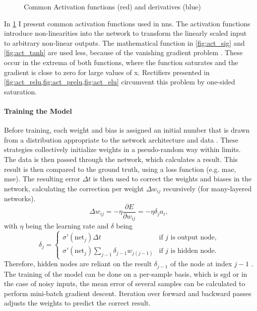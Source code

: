 \begin{figure}
    \caption{Common Activation functions (red) and derivatives (blue)}
    \label{fig:activations}
\end{figure}

In \cref{fig:activations} I present common activation functions used in \acp{nn}. The activation functions introduce non-linearities into the network to transform the linearly scaled input to arbitrary non-linear outputs. The mathematical function in \cref{fig:act_sig} and \cref{fig:act_tanh} are used less, because of the vanishing gradient problem \citep{hochreiter1991untersuchungen}. These occur in the extrema of both functions, where the function saturates and the gradient is close to zero for large values of x. Rectifiers presented in \cref{fig:act_relu,fig:act_prelu,fig:act_elu} circumvent this problem by one-sided saturation. 

\paragraph{Training the Model} 
Before training, each weight and bias is assigned an initial number that is drawn from a distribution appropriate to the network architecture and data \citep{lecun2012efficient, glorot2010understanding, he2015delving}. These strategies collectively initialize weights in a pseudo-random way within limits. The data is then passed through the network, which calculates a result. This result is then compared to the ground truth, using a loss function (e.g. \ac{mae}, \ac{mse}). The resulting error $\Delta t$ is then used to correct the weights and biases in the network, calculating the correction per weight $\Delta w_{ij}$ recursively (for many-layered networks).
\begin{equation}
    \Delta w_{ij}= -\eta \dfrac{\partial E}{\partial w_{ij}} = -\eta \delta_{j} a_{i},
\end{equation}
with $\eta$ being the learning rate and $\delta$ being
\begin{equation}
    \delta_{j}=\begin{cases}
\sigma'( \text{net}_{j} ) \Delta t              & \text{if } j \text{ is output node,}\\
\sigma'( \text{net}_{j} ) \sum_{j-1} \delta_{j-1} w_{j(j-1)} & \text{if } j \text{ is hidden node.}
\end{cases}
\end{equation}
Therefore, hidden nodes are reliant on the result $\delta_{j-1}$ of the node at index $j-1$ \citep{deeplearningbook}. The training of the model can be done on a per-sample basis, which is \ac{sgd} or in the case of noisy inputs, the mean error of several samples can be calculated to perform mini-batch gradient descent. Iteration over forward and backward passes adjusts the weights to predict the correct result. 

